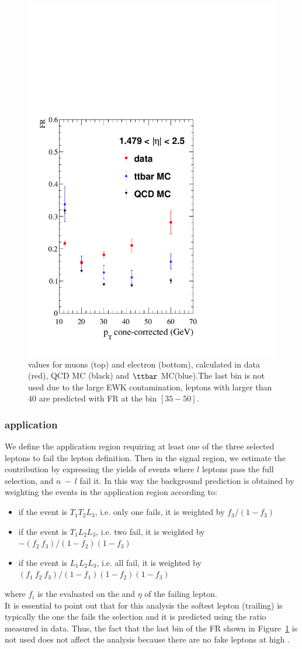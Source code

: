 \begin{figure}[h!]
\includegraphics[width=.23\textwidth]{Figures/c5/FAKE/ele3.pdf}
\caption{\fr values for muons (top) and electron (bottom), calculated in data (red), QCD MC (black) and $\ttbar$ MC(blue).The last bin is not used due to the large EWK contamination, leptons with \pt larger than 40 \GeV are predicted with FR at the bin $[35-50]$\GeV.}
\label{fig:comparison_muon}
\end{figure}


\subsubsection{\fr application}
We define the application region requiring at least one of the three
selected leptons to fail the \ti  lepton definition. Then in the signal region, we estimate the contribution by expressing the yields of events where $l$ leptons pass the full selection, and $n \ - \ l$ fail it. In this way the background prediction is obtained by weighting the events in the application region according to:
\begin{itemize}
\setlength\itemsep{-0.2em}
\item if the event is $T_{1}T_{2}L_{3}$, i.e. only one fails, it is weighted by $f_{3}/(1-f_{3})$
\item if the event is $T_{1}L_{2}L_{3}$, i.e. two fail, it is weighted
  by $- (f_{2} \ f_{3})/(1-f_{2})(1-f_{3})$
\item if the event is $L_{1}L_{2}L_{3}$, i.e. all fail, it is weighted by $(f_{1} \ f_{2} \ f_{3})/(1-f_{1})(1-f_{2})(1-f_{3})$
\end{itemize}
where $f_{i}$ is the \fr evaluated on the \ptcone and $\eta$
of the failing lepton.\\
It is essential to point out that for this analysis the softest lepton (trailing) is typically the one the fails the \ti  selection and it is predicted using the \fr ratio measured in data. Thus, the fact that the last bin of the FR shown in Figure~\ref{fig:comparison_muon} is not used does not affect the analysis because there are no fake leptons at high \pt. 


